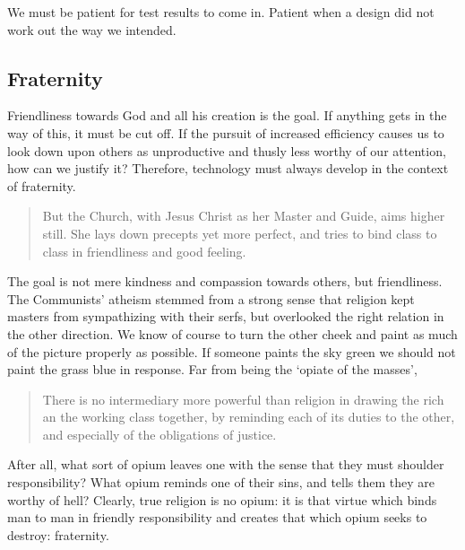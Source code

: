\documentclass[letterpaper]{article}
\begin{document}
We must be patient for test results to come in. Patient when a design did not work out the way we intended.

\subsection{Fraternity}

Friendliness towards God and all his creation is the goal. If anything gets in the way of this, it must be cut off. If the pursuit of increased efficiency causes us to look down upon others as unproductive and thusly less worthy of our attention, how can we justify it? Therefore, technology must always develop in the context of fraternity.

\begin{quote}
  But the Church, with Jesus Christ as her Master and Guide, aims higher still. She lays down precepts yet more perfect, and tries to bind class to class in friendliness and good feeling.
\end{quote}


The goal is not mere kindness and compassion towards others, but friendliness. The Communists' atheism stemmed from a strong sense that religion kept masters from sympathizing with their serfs, but overlooked the right relation in the other direction. We know of course to turn the other cheek and paint as much of the picture properly as possible. If someone paints the sky green we should not paint the grass blue in response. Far from being the `opiate of the masses',

\begin{quote}
  There is no intermediary more powerful than religion in drawing the rich an the working class together, by reminding each of its duties to the other, and especially of the obligations of justice.
\end{quote}

After all, what sort of opium leaves one with the sense that they must shoulder responsibility? What opium reminds one of their sins, and tells them they are worthy of hell? Clearly, true religion is no opium: it is that virtue which binds man to man in friendly responsibility and creates that which opium seeks to destroy: fraternity.
\end{document}
